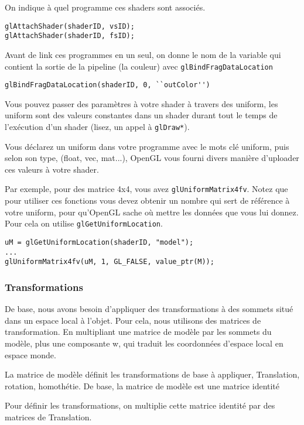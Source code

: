 \documentclass[pdftex, 11pt, a4paper, titlepage]{article}
\begin{document}
On indique à quel programme ces shaders sont associés.

\begin{lstlisting}
glAttachShader(shaderID, vsID);
glAttachShader(shaderID, fsID);
\end{lstlisting}

Avant de link ces programmes en un seul, on donne le nom de la
variable qui contient la sortie de la pipeline (la couleur) avec
\texttt{glBindFragDataLocation}

\begin{lstlisting}
glBindFragDataLocation(shaderID, 0, ``outColor'')
\end{lstlisting}

Vous pouvez passer des paramètres à votre shader à travers des
uniform, les uniform sont des valeurs constantes dans un shader durant
tout le temps de l'exécution d'un shader (lisez, un appel à
\texttt{glDraw*}).

Vous déclarez un uniform dans votre programme avec le mots clé
uniform, puis selon son type, (float, vec, mat...), OpenGL vous fourni
divers manière d'uploader ces valeurs à votre shader.

Par exemple, pour des matrice 4x4, vous avez
\texttt{glUniformMatrix4fv}.  Notez que pour utiliser ces fonctions
vous devez obtenir un nombre qui sert de référence à votre uniform,
pour qu'OpenGL sache où mettre les données que vous lui donnez. Pour
cela on utilise \texttt{glGetUniformLocation}.

\begin{lstlisting}
uM = glGetUniformLocation(shaderID, "model");
...
glUniformMatrix4fv(uM, 1, GL_FALSE, value_ptr(M));
\end{lstlisting}

\subsubsection{Transformations}

De base, nous avons besoin d'appliquer des transformations à des
sommets situé dans un espace local à l'objet.  Pour cela, nous
utilisons des matrices de transformation.  En multipliant une matrice
de modèle par les sommets du modèle, plus une composante w, qui
traduit les coordonnées d'espace local en espace monde.

La matrice de modèle définit les transformations de base à appliquer,
Translation, rotation, homothétie.  De base, la matrice de modèle est
une matrice identité

Pour définir les transformations, on multiplie cette matrice identité
par des matrices de Translation.
\end{document}

